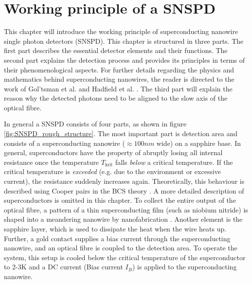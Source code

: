 \graphicspath{{/Users/maxim.re/Studium/Physik B.Sc./Semester_8_SS24/Proseminar/Figs Single Photon Detection/}}

\chapter{Working principle of a SNSPD}
\label{sec:SNSPD_working_principle}
This chapter will introduce the working principle of superconducting nanowire single photon detectors (SNSPD).
This chapter is structured in three parts.
The first part describes the essential detector elements and their functions.
The second part explains the detection process and provides its principles in terms of their phenomenological aspects.
For further details regarding the physics and mathematics behind superconducting nanowires, the reader is directed
to the work of Gol’tsman et al. \cite{goltsman-2001} and Hadfield et al. \cite{natarajan-2012}.
The third part will explain the reason why the detected photons need to be aligned to the slow axis of the optical fibre.

In general a SNSPD consists of four parts, as shown in figure \ref{fig:SNSPD_rough_structure}.
The most important part is detection area and consists of a superconducting nanowire ($\approx 100nm$ wide) on a sapphire base.
In general, superconductors have the property of abruptly losing all internal resistance once the temperature
$T_{\text{krit}}$ falls \textit{below} a critical temperature.
If the critical temperature is \textit{exceeded} (e.g. due to the environment or excessive current),
the resistance suddenly increases again.
Theoretically, this behaviour is described using Cooper pairs in the BCS theory \cite{bardeen-1957}.
A more detailed description of superconductors is omitted in this chapter.
To collect the entire output of the optical fibre, a pattern of a
thin superconducting film (such as niobium nitride) is shaped into a meandering nanowire by nanofabrication \cite{single-quantum-2022}.
Another element is the sapphire layer, which is used to dissipate the heat when the wire heats up.
Further, a gold contact supplies a bias current through the superconducting nanowire, and an optical fibre is coupled to the detection area.
To operate the system, this setup is cooled below the critical temperature of the superconductor to
2-3K and a DC current (Bias current $I_{B}$) is applied to the superconducting nanowire.

